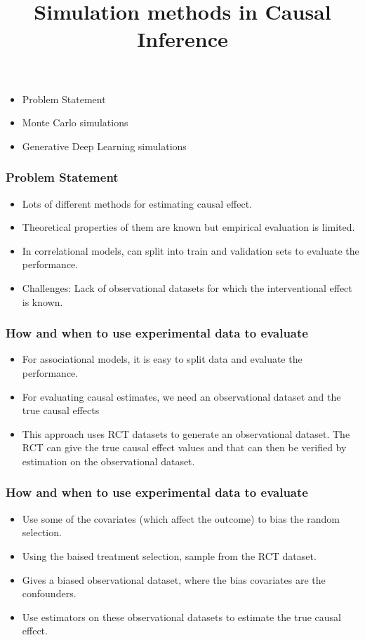 \documentclass{beamer}
\begin{document}
\title{Simulation methods in Causal Inference}

\begin{frame}
	\begin{itemize}
		\item Problem Statement
		\item Monte Carlo simulations
		\item Generative Deep Learning simulations
	\end{itemize}
\end{frame}
\begin{frame}
	\frametitle{Problem Statement}
	\begin{itemize}
		\item Lots of different methods for estimating causal effect.
		\item Theoretical properties of them are known but empirical evaluation is limited.
		\item In correlational models, can split into train and validation sets to evaluate the performance.
		\item Challenges: Lack of observational datasets for which the interventional effect is known.
	\end{itemize}
\end{frame}

\begin{frame}
	\frametitle{How and when to use experimental data to evaluate}
	\begin{itemize}
		\item For associational models, it is easy to split data and evaluate the performance.
		\item For evaluating causal estimates, we need an observational dataset and the true causal effects
		\item This approach uses RCT datasets to generate an observational dataset. The RCT can give the true causal effect values and that can then be verified by estimation on the observational dataset.
	\end{itemize}
\end{frame}

\begin{frame}
	\frametitle{How and when to use experimental data to evaluate}
	\begin{itemize}
		\item Use some of the covariates (which affect the outcome) to bias the random
			selection.
		\item Using the baised treatment selection, sample from the RCT dataset.
		\item Gives a biased observational dataset, where the bias covariates are the 
			confounders.
		\item Use estimators on these observational datasets to estimate the true 
			causal effect.
	\end{itemize}
\end{frame}
\end{document}
